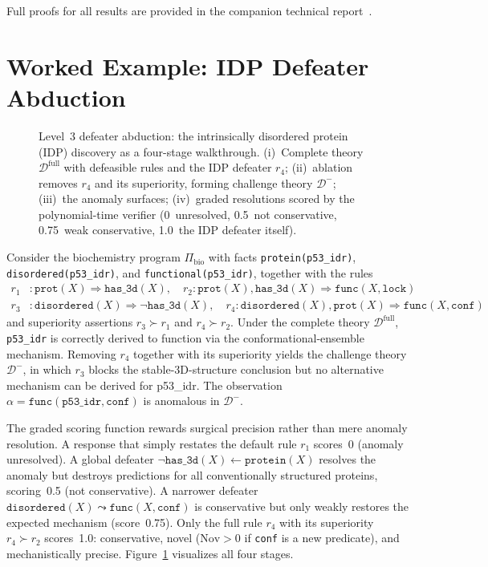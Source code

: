 \documentclass{article}
\theoremstyle{definition}
\newcommand{\Dm}{\mathcal{D}^{-}}
\newcommand{\Dfull}{\mathcal{D}^{\mathrm{full}}}
\newcommand{\Nov}{\mathrm{Nov}}
\newcommand{\defto}{\Rightarrow}
\newcommand{\defeatto}{\leadsto}
\begin{document}
Full proofs for all results are provided in the companion technical report~\citep{cooper2026defab}.


\section{Worked Example: IDP Defeater Abduction}\label{app:example_idp}

\begin{figure}[h]
\centering
\resizebox{\textwidth}{!}{}
\caption{Level~3 defeater abduction: the intrinsically disordered protein (IDP) discovery as a four-stage walkthrough. (i)~Complete theory $\Dfull$ with defeasible rules and the IDP defeater $r_4$; (ii)~ablation removes $r_4$ and its superiority, forming challenge theory $\Dm$; (iii)~the anomaly surfaces; (iv)~graded resolutions scored by the polynomial-time verifier (0~unresolved, 0.5~not conservative, 0.75~weak conservative, 1.0~the IDP defeater itself).}
\label{fig:level3example}
\end{figure}

Consider the biochemistry program $\Pi_{\mathrm{bio}}$ with facts \texttt{protein(p53\_idr)}, \texttt{disordered(p53\_idr)}, and \texttt{functional(p53\_idr)}, together with the rules
\begin{align*}
    r_1&: \texttt{prot}(X) \defto \texttt{has\_3d}(X), \quad
    r_2: \texttt{prot}(X), \texttt{has\_3d}(X) \defto \texttt{func}(X, \texttt{lock}) \\
    r_3&: \texttt{disordered}(X) \defto \neg\texttt{has\_3d}(X), \quad
    r_4: \texttt{disordered}(X), \texttt{prot}(X) \defto \texttt{func}(X, \texttt{conf})
\end{align*}
and superiority assertions $r_3 \succ r_1$ and $r_4 \succ r_2$. Under the complete theory $\Dfull$, \texttt{p53\_idr} is correctly derived to function via the conformational-ensemble mechanism. Removing $r_4$ together with its superiority yields the challenge theory $\Dm$, in which $r_3$ blocks the stable-3D-structure conclusion but no alternative mechanism can be derived for p53\_idr. The observation $\alpha = \texttt{func}(\texttt{p53\_idr}, \texttt{conf})$ is anomalous in $\Dm$.

The graded scoring function rewards surgical precision rather than mere anomaly resolution. A response that simply restates the default rule $r_1$ scores~0 (anomaly unresolved). A global defeater $\neg\texttt{has\_3d}(X) \leftarrow \texttt{protein}(X)$ resolves the anomaly but destroys predictions for all conventionally structured proteins, scoring~0.5 (not conservative). A narrower defeater $\texttt{disordered}(X) \defeatto \texttt{func}(X, \texttt{conf})$ is conservative but only weakly restores the expected mechanism (score~0.75). Only the full rule $r_4$ with its superiority $r_4 \succ r_2$ scores~1.0: conservative, novel ($\Nov > 0$ if \texttt{conf} is a new predicate), and mechanistically precise. Figure~\ref{fig:level3example} visualizes all four stages.
\end{document}

